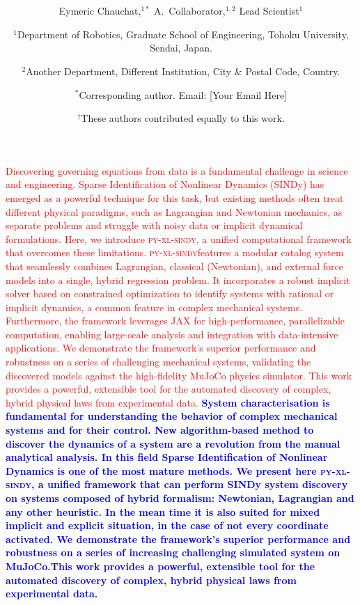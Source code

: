 \documentclass[12pt]{article}
\date{}
\title{\bfseries \boldmath \scititle}
\author{
	Eymeric Chauchat,$^{1\ast}$
	A.~Collaborator,$^{1,2}$
	Lead Scientist$^{1}$\and
	\small$^{1}$Department of Robotics, Graduate School of Engineering, Tohoku University, Sendai, Japan.\and
	\small$^{2}$Another Department, Different Institution, City \& Postal Code, Country.\and
	\small$^\ast$Corresponding author. Email: [Your Email Here]\and
	\small$^\dagger$These authors contributed equally to this work.
	\TODO{correctly format, add correct people}
}
\renewenvironment{abstract}
	{\quotation}
	{\endquotation}
\newcommand{\frameworkname}{\textsc{py-xl-sindy}}
\newcommand{\concurrentversion}[2]{%
    \textcolor{red}{#1} \textcolor{blue}{\textbf{#2}}%
}
\begin{document}
 

\maketitle

\begin{abstract} \bfseries \boldmath

\concurrentversion{
Discovering governing equations from data is a fundamental challenge in science and engineering. Sparse Identification of Nonlinear Dynamics (SINDy) has emerged as a powerful technique for this task, but existing methods often treat different physical paradigms, such as Lagrangian and Newtonian mechanics, as separate problems and struggle with noisy data or implicit dynamical formulations. Here, we introduce \frameworkname, a unified computational framework that overcomes these limitations. \frameworkname features a modular catalog system that seamlessly combines Lagrangian, classical (Newtonian), and external force models into a single, hybrid regression problem. It incorporates a robust implicit solver based on constrained optimization to identify systems with rational or implicit dynamics, a common feature in complex mechanical systems. Furthermore, the framework leverages JAX for high-performance, parallelizable computation, enabling large-scale analysis and integration with data-intensive applications. We demonstrate the framework's superior performance and robustness on a series of challenging mechanical systems, validating the discovered models against the high-fidelity MuJoCo physics simulator. This work provides a powerful, extensible tool for the automated discovery of complex, hybrid physical laws from experimental data.
}{
System characterisation is fundamental for understanding the behavior of complex mechanical systems and for their control. New algorithm-based method to discover the dynamics of a system are a revolution from the manual analytical analysis. In this field Sparse Identification of Nonlinear Dynamics is one of the most mature methods. We present here \frameworkname, a unified framework that can perform SINDy system discovery on systems composed of hybrid formalism: Newtonian, Lagrangian and any other heuristic. In the mean time it is also suited for mixed implicit and explicit situation, in the case of not every coordinate activated. We demonstrate the framework's superior performance and robustness on a series of increasing challenging simulated system on MuJoCo.This work provides a powerful, extensible tool for the automated discovery of complex, hybrid physical laws from experimental data.
}
\end{abstract}
\end{document}
